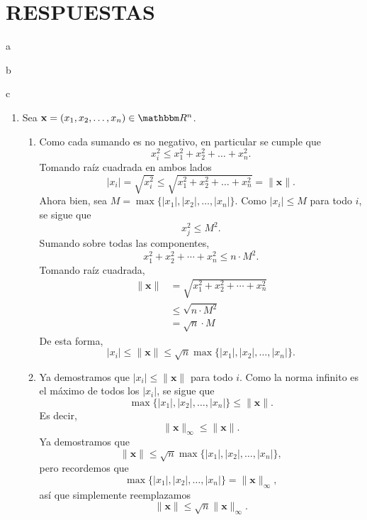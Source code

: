 \chapter{RESPUESTAS}

a


b


c

\respuestasPage
\twocolumn


\begin{enumerate}
    \item Sea $\mathbf{x} = (x_1, x_2, \dots, x_n) \in \RR[n]$.
    \begin{enumerate}
        \item Como cada sumando es no negativo, en particular se cumple que
        $$x_i^2 \leq x_1^2 + x_2^2 + \dots + x_n^2.$$
        Tomando raíz cuadrada en ambos lados
        $$|x_i| = \sqrt{x_i^2} \leq \sqrt{x_1^2 + x_2^2 + \dots + x_n^2} = \| \mathbf{x} \|.$$
        Ahora bien, sea $M = \max \{|x_1|, |x_2|, \dots, |x_n|\}$. Como $|x_i| \leq M$ para todo $i$, se sigue que
        $$x_j^2 \leq M^2.$$
        Sumando sobre todas las componentes,
        $$x_1^2 + x_2^2 + \cdots + x_n^2 \leq n \cdot M^2.$$
        Tomando raíz cuadrada,
        \begin{align*}
            \| \mathbf{x} \| & = \sqrt{x_1^2 + x_2^2 + \cdots + x_n^2} \\
            & \leq \sqrt{n \cdot M^2} \\
            & = \sqrt{n} \cdot M
        \end{align*}
        De esta forma,
        $$|x_i| \leq \| \mathbf{x} \| \leq \sqrt{n} \max \{ |x_1|, |x_2|, \dots, |x_n|\}.$$
        \item Ya demostramos que $|x_i| \leq \| \mathbf{x} \|$ para todo $i$. Como la norma infinito es el máximo de todos los $|x_i|$, se sigue que
        $$\max \{ |x_1|, |x_2|, \dots, |x_n| \} \leq \| \mathbf{x} \|.$$
        Es decir,
        $$\| \mathbf{x} \|_{\infty} \leq \| \mathbf{x} \|.$$
        Ya demostramos que
        $$\| \mathbf{x} \| \leq \sqrt{n} \max \{ |x_1|, |x_2|, \dots, |x_n|\},$$
        pero recordemos que
        $$\max \{|x_1|, |x_2|, \dots, |x_n|\} = \| \mathbf{x} \|_{\infty},$$
        así que simplemente reemplazamos
        $$\| \mathbf{x} \| \leq \sqrt{n} \| \mathbf{x} \|_{\infty}.$$

\end{enumerate}
\end{enumerate}
